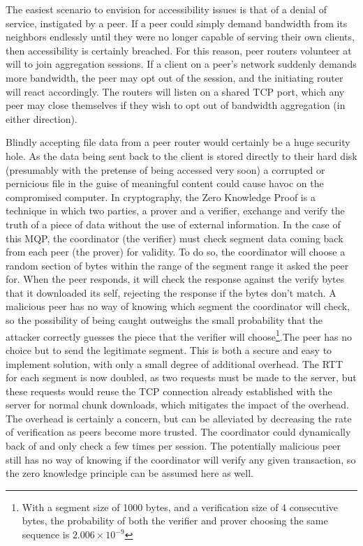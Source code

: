 \documentclass[12pt]{article}
\begin{document}
		The easiest scenario to envision for accessibility issues is that of a denial of service, instigated by a peer. If a peer could simply demand bandwidth from its neighbors endlessly until they were no longer capable of serving their own clients, then accessibility is certainly breached. For this reason, peer routers volunteer at will to join aggregation sessions. If a client on a peer's network suddenly demands more bandwidth, the peer may opt out of the session, and the initiating router will react accordingly. The routers will listen on a shared TCP port, which any peer may close themselves if they wish to opt out of bandwidth aggregation (in either direction).

		Blindly accepting file data from a peer router would certainly be a huge security hole. As the data being sent back to the client is stored directly to their hard disk (presumably with the pretense of being accessed very soon) a corrupted or pernicious file in the guise of meaningful content could cause havoc on the compromised computer. In cryptography, the Zero Knowledge Proof \cite{goldreich1994definitions} is a technique in which two parties, a prover and a verifier, exchange and verify the truth of a piece of data without the use of external information. In the case of this MQP, the coordinator (the verifier) must check segment data coming back from each peer (the prover) for validity. To do so, the coordinator will choose a random section of bytes within the range of the segment range it asked the peer for. When the peer responds, it will check the response against the verify bytes that it downloaded its self, rejecting the response if the bytes don't match. A malicious peer has no way of knowing which segment the coordinator will check, so the possibility of being caught outweighs the small probability that the attacker correctly guesses the piece that the verifier will choose\footnote{With a segment size of 1000 bytes, and a verification size of 4 consecutive bytes, the probability of both the verifier and prover choosing the same sequence is $2.006\times10^{-9}$}.The peer has no choice but to send the legitimate segment. This is both a secure and easy to implement solution, with only a small degree of additional overhead. The RTT for each segment is now doubled, as two requests must be made to the server, but these requests would reuse the TCP connection already established with the server for normal chunk downloads, which mitigates the impact of the overhead. The overhead is certainly a concern, but can be alleviated by decreasing the rate of verification as peers become more trusted. The coordinator could dynamically back of and only check a few times per session. The potentially malicious peer still has no way of knowing if the coordinator will verify any given transaction, so the zero knowledge principle can be assumed here as well. 
\end{document}
